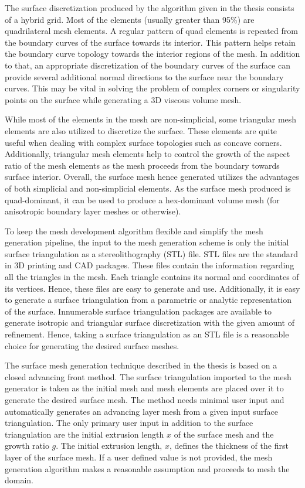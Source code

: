 The surface discretization produced by the algorithm given in the thesis consists of a hybrid grid. Most of the elements (usually greater than 95\%) are quadrilateral mesh elements. A regular pattern of quad elements is repeated from the boundary curves of the surface towards its interior. This pattern helps retain the boundary curve topology towards the interior regions of the mesh. In addition to that, an appropriate discretization of the boundary curves of the surface can provide several additional normal directions to the surface near the boundary curves. This may be vital in solving the problem of complex corners or singularity points on the surface while generating a 3D viscous volume mesh.

While most of the elements in the mesh are non-simplicial, some triangular mesh elements are also utilized to discretize the surface. These elements are quite useful when dealing with complex surface topologies such as concave corners. Additionally, triangular mesh elements help to control the growth of the aspect ratio of the mesh elements as the mesh proceeds from the boundary towards surface interior. Overall, the surface mesh hence generated utilizes the advantages of both simplicial and non-simplicial elements. As the surface mesh produced is quad-dominant, it can be used to produce a hex-dominant volume mesh (for anisotropic boundary layer meshes or otherwise).

To keep the mesh development algorithm flexible and simplify the mesh generation pipeline, the input to the mesh generation scheme is only the initial surface triangulation as a stereolithography (STL) file. STL files are the standard in 3D printing and CAD packages. These files contain the information regarding all the triangles in the mesh. Each triangle contains its normal and coordinates of its vertices. Hence, these files are easy to generate and use. Additionally, it is easy to generate a surface triangulation from a parametric or analytic representation of the surface. Innumerable surface triangulation packages are available to generate isotropic and triangular surface discretization with the given amount of refinement. Hence, taking a surface triangulation as an STL file is a reasonable choice for generating the desired surface meshes.

The surface mesh generation technique described in the thesis is based on a closed advancing front method. The surface triangulation imported to the mesh generator is taken as the initial mesh and mesh elements are placed over it to generate the desired surface mesh. The method needs minimal user input and automatically generates an advancing layer mesh from a given input surface triangulation. The only primary user input in addition to the surface triangulation are the initial extrusion length $x$ of the surface mesh and the growth ratio $g$. The initial extrusion length, $x$, defines the thickness of the first layer of the surface mesh. If a user defined value is not provided, the mesh generation algorithm makes a reasonable assumption and proceeds to mesh the domain. 

